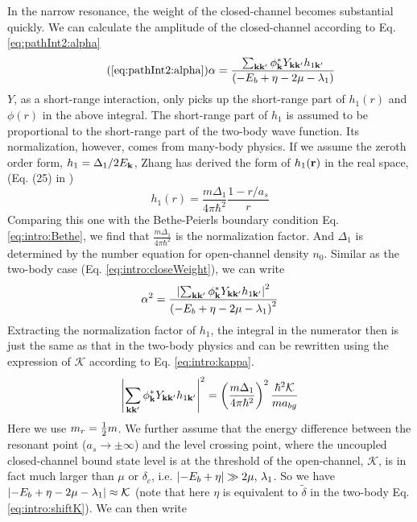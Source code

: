 In the narrow resonance, the weight of the closed-channel becomes substantial quickly.  We can calculate the amplitude of the closed-channel according to  Eq. \ref{eq:pathInt2:alpha}
\begin{equation}\tag{\ref{eq:pathInt2:alpha}}
\alpha=\frac{\sum_{\vk\vk'}{\phi_{\vk}^{*}}{Y_{\vk\vk'}}{h_{1\vk'}}}{\br{-E_{b}+\eta-2\mu-\lambda_{1}}}
\end{equation}
  $Y$, as a short-range interaction, only picks up the short-range part of $h_{1}(r)$ and $\phi(r)$ in the above integral. The short-range part of $h_{1}$ is assumed to be proportional to the short-range part of the two-body wave function. Its normalization, however, comes from many-body physics. If we assume the zeroth order form, $h_{1}=\Delta_{1}/2E_{\mathbf{k}}$,   Zhang has derived the form of  $h_{1}(\mathbf{r})$ in the real space, (Eq. (25) in \cite{shizhongSumRule})
  \begin{equation}
  h_{1}(r)=\frac{m\Delta_{1}}{4\pi\hbar^{2}}\frac{1-r/a_{s}}{r}
  \end{equation}
Comparing this one with the Bethe-Peierls boundary condition Eq. \ref{eq:intro:Bethe}, we find that $\frac{m\Delta_{1}}{4\pi\hbar^{2}}$ is the normalization factor.  And $\Delta_{1}$ is determined by the number equation for open-channel density $n_{0}$.  Similar as the two-body case (Eq. \ref{eq:intro:closeWeight}), we can write
\begin{equation}
\alpha^{2}=\frac{\left\lvert{\sum_{\ensuremath{\mathbf{k}}\ensuremath{\mathbf{k}}'}{\phi_{\ensuremath{\mathbf{k}}}^{*}}{Y_{\ensuremath{\mathbf{k}}\ensuremath{\mathbf{k}}'}}{h_{1\ensuremath{\mathbf{k}}'}}}\right\rvert^{2}}{\left(-E_{b}+\eta-2\mu-\lambda_{1}\right)^{2}}
\end{equation}
Extracting the normalization factor of $h_{1}$, the integral in the numerator then is just the same as that in the two-body physics and can be rewritten using the expression of  $\mathcal{K}$ according to Eq. \ref{eq:intro:kappa}.  
\begin{equation}
\left\lvert{\sum_{\ensuremath{\mathbf{k}}\ensuremath{\mathbf{k}}'}{\phi_{\ensuremath{\mathbf{k}}}^{*}}{Y_{\ensuremath{\mathbf{k}}\ensuremath{\mathbf{k}}'}}{h_{1\ensuremath{\mathbf{k}}'}}}\right\rvert^{2}=\left(\frac{m\Delta_{1}}{4\pi\hbar^{2}}\right)^{2}\frac{\hbar^{2}\mathcal{K}}{ma_{bg}}
\end{equation}
Here we use $m_{r}=\frac{1}{2}m$.
We further assume that the energy difference between the resonant point ($a_{s}\to\pm\infty$) and the level crossing point, where the uncoupled closed-channel bound state level is at the threshold of the open-channel, $\mathcal{K}$, is in fact much larger than $\mu$ or $\delta_{c}$, i.e. $\left\lvert{-E_{b}+\eta}\right\rvert\gg2\mu,\,\lambda_{1}$. So we have $\left\lvert{-E_{b}+\eta-2\mu-\lambda_{1}}\right\rvert\approx\mathcal{K}$ (note that here $\eta$ is equivalent to $\tilde\delta$ in the two-body Eq. \ref{eq:intro:shiftK}). We can  then write
